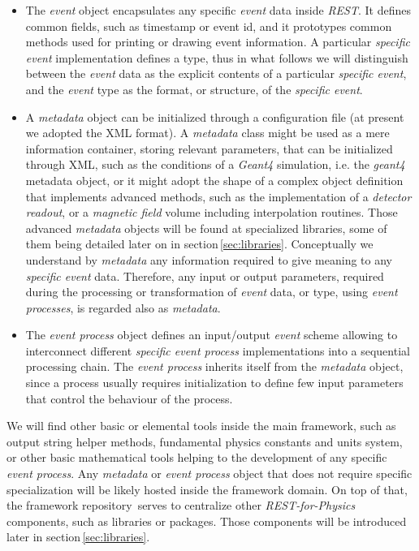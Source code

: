 
\begin{itemize}
    \item The \emph{event} object encapsulates any specific \emph{event} data inside \emph{REST}. It defines common fields, such as timestamp or event id, and it prototypes common methods used for printing or drawing event information. A particular \emph{specific event} implementation defines a type, thus in what follows we will distinguish between the \emph{event} data as the explicit contents of a particular \emph{specific event}, and the \emph{event} type as the format, or structure, of the \emph{specific event}.
    
    \item A \emph{metadata} object can be initialized through a configuration file (at present we adopted the XML format). A \emph{metadata} class might be used as a mere information container, storing relevant parameters, that can be initialized through XML, such as the conditions of a \emph{Geant4} simulation, i.e. the \emph{geant4} metadata object, or it might adopt the shape of a complex object definition that implements advanced methods, such as the implementation of a \emph{detector readout}, or a \emph{magnetic field} volume including interpolation routines. Those advanced \emph{metadata} objects will be found at specialized libraries, some of them being detailed later on in section\,\ref{sec:libraries}. Conceptually we understand by \emph{metadata} any information required to give meaning to any \emph{specific event} data. Therefore, any input or output parameters, required during the processing or transformation of \emph{event} data, or type, using \emph{event processes}, is regarded also as \emph{metadata}. 
    
    \item The \emph{event process} object defines an input/output \emph{event} scheme allowing to interconnect different \emph{specific event process} implementations into a sequential processing chain. The \emph{event process} inherits itself from the \emph{metadata} object, since a process usually requires initialization to define few input parameters that control the behaviour of the process.
\end{itemize}

We will find other basic or elemental tools inside the main framework, such as output string helper methods, fundamental physics constants and units system, or other basic mathematical tools helping to the development of any specific \emph{event process}. Any \emph{metadata} or \emph{event process} object that does not require specific specialization will be likely hosted inside the framework domain.
 On top of that, the framework repository\,\cite{REST_Framework_Git} serves to centralize other \emph{REST-for-Physics} components, such as libraries or packages. Those components will be introduced later in section\,\ref{sec:libraries}.%

